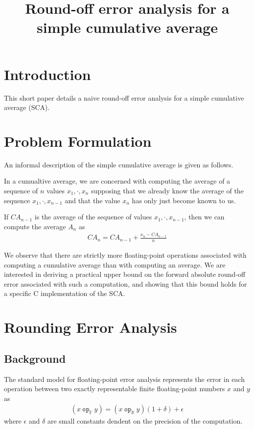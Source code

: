 \documentclass{llncs}
\title{Round-off error analysis for a simple cumulative average}
\begin{document}
\maketitle



\section{Introduction}\label{sec:Introduction}
This short paper details a naive round-off error analysis for a simple cumulative average (SCA). 

\section{Problem Formulation} \label{sec:formulation}
An informal description of the simple cumulative average is given as follows. 

In a cumualtive average, we are concerned with computing the average of a sequence of $n$ values  $x_1, \cdot, x_{n}$  supposing that we already know the average of the sequence $x_1, \cdot, x_{n-1}$ and that the value $x_n$ has only just become known to us. 

If $CA_{n-1}$ is the average of the sequence of values $x_1, \cdot, x_{n-1}$, then we can compute the average $A_n$ as
\begin{align}\label{eq:avg}
CA_{n} = CA_{n-1} + \frac{x_{n} - CA_{n-1}}{n}
\end{align}

We observe that there are strictly more floating-point operations associated with computing a cumulative average than with computing an average.  We are interested in deriving a practical upper bound on the forward absolute round-off error associated with such a computation, and showing that this bound holds for a specific C implementation of the SCA.  

\section{Rounding Error Analysis}

\subsection{Background}
The standard model for floating-point error analysis represents the error in each operation between two exactly representable finite floating-point numbers $x$ and $y$ as  
\begin{align}
(x\  \texttt{op}_\mathbb{F} \ y) = (x \ \texttt{op}_\mathbb{R}\ y)(1 + \delta) + \epsilon
\end{align}
where $\epsilon$ and $\delta$ are small constants dendent on the precision of the computation.  
\end{document}
